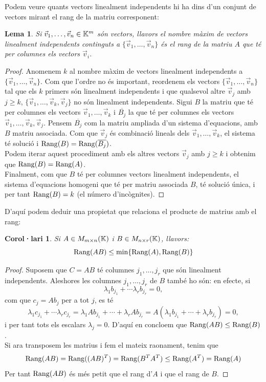 \documentclass[
  11pt,
]{book}
\numberwithin{dummy}{section}
\theoremstyle{maincolornumbox}
\theoremstyle{blacknumex}
\theoremstyle{blacknumbox}
\newtheorem{corollaryT}{Corol·lari}[chapter]
\theoremstyle{maincolornum}
\newtheorem{lemmaT}{Lema}[chapter]
\newenvironment{lemma}{\begin{pBox}\begin{lemmaT}}{\end{lemmaT}\end{pBox}}
\newenvironment{corollary}{\begin{cBox}\begin{corollaryT}}{\end{corollaryT}\end{cBox}}
\newlength\esp
\begin{document}
Podem veure quants vectors linealment independents hi ha dins d'un
conjunt de vectors mirant el rang de la matriu corresponent:

\begin{lemma}
\protect\hypertarget{lem:rangiLI}{}\label{lem:rangiLI}Si
\(\vec v_1, \dots ,\vec v_n\in\mathbb{K}^m\) són vectors, llavors el nombre màxim
de vectors linealment independents continguts a
\(\{\vec v_1, \dots ,\vec v_n\}\) és el rang de la matriu \(A\) que té per
columnes els vectors \(\vec v_i\).
\end{lemma}

\begin{proof}
Anomenem \(k\) al nombre màxim de vectors linealment independents
a \(\{\vec v_1, \dots ,\vec v_n\}\). Com que l'ordre no és important,
reordenem els vectors \(\{\vec v_1, \dots ,\vec v_n\}\) tal que els \(k\)
primers són linealment independents i que qualsevol altre \(\vec v_j\) amb
\(j\geq k\), \(\{\vec v_1, \dots ,\vec v_k,\vec v_j\}\) no són linealment
independents. Sigui \(B\) la matriu que té per columnes els vectors
\(\vec v_1, \dots, \vec v_k\) i \(\overline{B_j}\) la que té per columnes
els vectors \(\vec v_1, \dots, \vec v_k,\vec v_j\). Pensem
\(\overline{B_j}\) com la matriu ampliada d'un sistema d'equacions, amb
\(B\) matriu associada. Com que \(\vec v_j\) és combinació lineals dels
\(\vec v_1, \dots, \vec v_k\), el sistema té solució i
\(\operatorname{Rang}(B)=\operatorname{Rang}(\overline{B_j})\).\\
Podem iterar aquest procediment amb els altres vectors \(\vec v_{j}\) amb
\(j\geq k\) i obtenim que \(\operatorname{Rang}(B)=\operatorname{Rang}(A)\).\\
Finalment, com que \(B\) té per columnes vectors linealment independents,
el sistema d'equacions homogeni que té per matriu associada \(B\), té
solució única, i per tant \(\operatorname{Rang}(B)=k\) (el número d'incògnites).
\end{proof}

D'aquí podem deduir una propietat que relaciona el producte de matrius
amb el rang:

\begin{corollary}
Si \(A\in M_{m\times n}(\mathbb{K})\) i \(B\in M_{n\times r}(\mathbb{K})\), llavors:
\[\operatorname{Rang}(AB)\leq \min\{\operatorname{Rang}(A),\operatorname{Rang}(B)\}\]
\end{corollary}

\begin{proof}
Suposem que \(C=AB\) té columnes \(j_1,\ldots,j_r\) que són
linealment independents. Aleshores les columnes \(j_1,\ldots,j_r\) de \(B\)
també ho són: en efecte, si
\[\lambda_1b_{j_1}+\cdots\lambda_rb_{j_r} = 0,\] com que \(c_j=Ab_j\) per
a tot \(j\), es té
\[\lambda_1 c_{j_1} +\cdots \lambda_r c_{j_r}=\lambda_1 A b_{j_1} + \cdots + \lambda_r A b_{j_r} = A(\lambda_1b_{j_1}+\cdots+\lambda_r b_{j_r})=0,\]
i per tant tots els escalars \(\lambda_j=0\). D'aquí en concloem que
\(\operatorname{Rang}(AB)\leq \operatorname{Rang}(B)\).\\
Si ara transposem les matrius i fem el mateix raonament, tenim que
\[\operatorname{Rang}(AB)=\operatorname{Rang}((AB)^T)=\operatorname{Rang}(B^TA^T)\leq \operatorname{Rang}(A^T)=\operatorname{Rang}(A)\] Per
tant \(\operatorname{Rang}(AB)\) és més petit que el rang d'\(A\) i que el rang de \(B\).
\end{proof}
\end{document}
